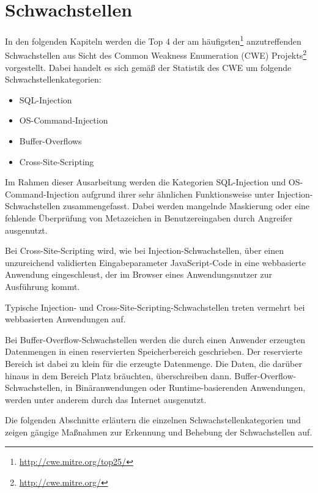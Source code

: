 \fancyhead[L]{} %
\section{Schwachstellen}

In den folgenden Kapiteln werden die Top 4 der am häufigsten\footnote{\url{http://cwe.mitre.org/top25/}} 
anzutreffenden Schwachstellen aus Sicht des Common Weakness Enumeration (CWE) 
Projekts\footnote{\url{http://cwe.mitre.org/}} vorgestellt. Dabei handelt es sich 
gemäß der Statistik des CWE um folgende Schwachstellenkategorien:

\begin{itemize}
  \item SQL-Injection
  \item OS-Command-Injection
  \item Buffer-Overflows
  \item Cross-Site-Scripting
\end{itemize}

Im Rahmen dieser Ausarbeitung werden die Kategorien SQL-Injection und 
OS-Command-Injection aufgrund ihrer sehr ähnlichen Funktionsweise 
unter Injection-\\Schwachstellen zusammengefasst.
Dabei werden mangelnde Maskierung oder eine fehlende Überprüfung von Metazeichen 
in Benutzereingaben durch Angreifer ausgenutzt.

Bei Cross-Site-Scripting wird, wie bei Injection-Schwachstellen, 
über einen unzureichend validierten Eingabeparameter JavaScript-Code in 
eine webbasierte Anwendung eingeschleust, der im Browser eines 
Anwendungsnutzer zur Ausführung kommt.

Typische Injection- und Cross-Site-Scripting-Schwachstellen treten 
vermehrt bei webbasierten Anwendungen auf.

Bei Buffer-Overflow-Schwachstellen werden die durch einen Anwender erzeugten
Datenmengen in einen reservierten Speicherbereich geschrieben. 
Der reservierte Bereich ist dabei zu klein für die erzeugte Datenmenge.
Die Daten, die darüber hinaus in dem Bereich Platz bräuchten, überschreiben 
dann.  
Buffer-Overflow-Schwachstellen, in Binäranwendungen oder 
Runtime-basierenden Anwendungen, werden unter anderem durch das Internet 
ausgenutzt.

Die folgenden Abschnitte erläutern die einzelnen Schwachstellenkategorien 
und zeigen gängige Maßnahmen zur Erkennung und Behebung der Schwachstellen auf.

\newpage
\fancyhead[L]{\nouppercase{\leftmark}} %


